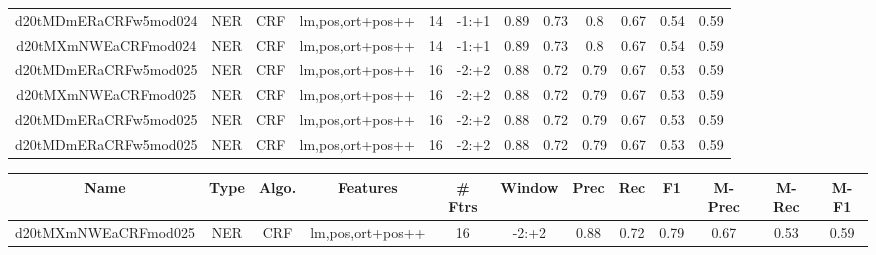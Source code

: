 \documentclass[a4paper]{article}
\begin{document}
\begin{landscape}
\begin{center}
\begin{tabular}{ |c|c|c|c|c|c|c|c|c|c|c|c|}
 	
 
 	
 		
 		\small{ d20tMDmERaCRFw5mod024 } & NER & CRF & lm,pos,ort+pos++  &  14 &  -1:+1  &  0.89 & 0.73 & 0.8  &  0.67 & 0.54 & 0.59 \\
 		

 	
 
 	
 		
 		\small{ d20tMXmNWEaCRFmod024 } & NER & CRF & lm,pos,ort+pos++  &  14 &  -1:+1  &  0.89 & 0.73 & 0.8  &  0.67 & 0.54 & 0.59 \\
 		

 	
 
 	
 		
 		\small{ d20tMDmERaCRFw5mod025 } & NER & CRF & lm,pos,ort+pos++  &  16 &  -2:+2  &  0.88 & 0.72 & 0.79  &  0.67 & 0.53 & 0.59 \\
 		

 	
 
 	
 		
 		\small{ d20tMXmNWEaCRFmod025 } & NER & CRF & lm,pos,ort+pos++  &  16 &  -2:+2  &  0.88 & 0.72 & 0.79  &  0.67 & 0.53 & 0.59 \\
 		

 	
 
 	
 		
 		\small{ d20tMDmERaCRFw5mod025 } & NER & CRF & lm,pos,ort+pos++  &  16 &  -2:+2  &  0.88 & 0.72 & 0.79  &  0.67 & 0.53 & 0.59 \\
 		

 	
 
 	
 		
 		\small{ d20tMDmERaCRFw5mod025 } & NER & CRF & lm,pos,ort+pos++  &  16 &  -2:+2  &  0.88 & 0.72 & 0.79  &  0.67 & 0.53 & 0.59 \\
 		
 \hline
\end{tabular}
\end{center}




\begin{center}
\begin{tabular}{ |c|c|c|c|c|c|c|c|c|c|c|c|} 
 \hline
 	Name & Type & Algo. & Features & \# Ftrs & Window & Prec & Rec & F1 & M-Prec & M-Rec & M-F1\\
 \hline

 		

 	
 
 	
 		
 		\small{ d20tMXmNWEaCRFmod025 } & NER & CRF & lm,pos,ort+pos++  &  16 &  -2:+2  &  0.88 & 0.72 & 0.79  &  0.67 & 0.53 & 0.59 \\
 		


\end{tabular}
\end{center}
\end{landscape}
\end{document}
